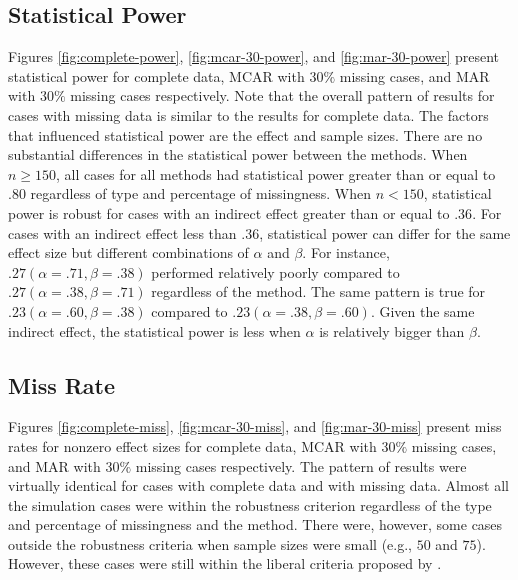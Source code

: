 \documentclass[man]{apa7}\usepackage[]{graphicx}\usepackage[]{xcolor}
\begin{document}
\subsection{Statistical Power}

Figures
\ref{fig:complete-power},
\ref{fig:mcar-30-power},
and
\ref{fig:mar-30-power}
present statistical power for
complete data,
MCAR with $30\%$ missing cases,
and
MAR with $30\%$ missing cases respectively.
Note that the overall pattern of results for cases with missing data is similar
to the results for complete data.
The factors that influenced statistical power are the effect and sample sizes.
There are no substantial differences in the statistical power between the methods.
When $n \geq 150$,
all cases for all methods had statistical power greater than
or equal to $.80$ regardless of type and percentage of missingness.
When $n < 150$,
statistical power is robust for cases with an indirect effect greater than or equal to $.36$.
For cases with an indirect effect less than $.36$,
statistical power can differ
for the same effect size
but different combinations of ${\alpha}$ and ${\beta}$.
For instance,
$.27(\alpha = .71, \beta = .38)$ performed relatively poorly
compared to
$.27(\alpha = .38, \beta = .71)$
regardless of the method.
The same pattern is true for
$.23(\alpha = .60, \beta = .38)$
compared to
$.23(\alpha = .38, \beta = .60)$.
Given the same indirect effect,
the statistical power is less when
${\alpha}$
is relatively bigger than 
${\beta}$.

\subsection{Miss Rate}

Figures
\ref{fig:complete-miss},
\ref{fig:mcar-30-miss},
and
\ref{fig:mar-30-miss}
present miss rates for nonzero effect sizes
for complete data,
MCAR with 
$30\%$
missing cases,
and MAR with
$30\%$
missing cases
respectively.
The pattern of results were virtually identical
for cases with complete data and with missing data.
Almost all the simulation cases were within the robustness criterion
regardless of the type and percentage of missingness and the method.
There were,
however,
some cases outside the robustness criteria
when sample sizes were small
(e.g.,
$50$
and
$75$).
However,
these cases were still within the liberal criteria proposed by
\Textcite{Lib-Simulation-Robustness-Bradley-1978}.
\end{document}
